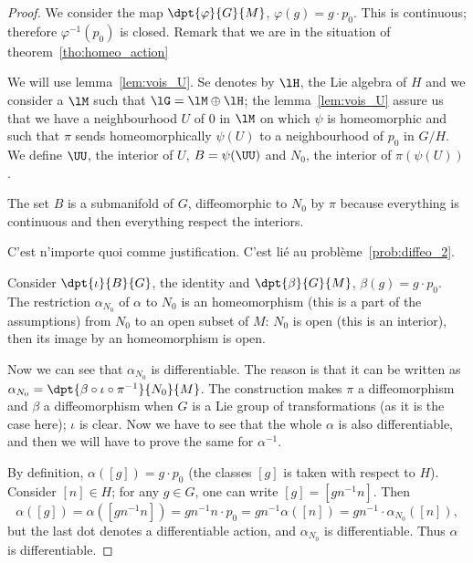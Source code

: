 \begin{proof}
	We consider the map $\dpt{\varphi}{G}{M}$, $\varphi(g)=g\cdot p_0$. This is continuous; therefore $\varphi^{-1}(p_0)$ is closed. Remark that we are in the situation of theorem~\ref{tho:homeo_action}

	We will use lemma~\ref{lem:vois_U}. Se denotes by $\lH$, the Lie algebra of $H$ and we consider a $\lM$ such that $\lG=\lM\oplus\lH$; the lemma~\ref{lem:vois_U} assure us that we have a neighbourhood $U$ of $0$ in $\lM$ on which $\psi$ is homeomorphic and such that $\pi$ sends homeomorphically $\psi(U)$ to a neighbourhood of $p_0$ in $G/H$. We define $\UU$, the interior of $U$, $B=\psi(\UU)$ and $N_0$, the interior of $\pi(\psi(U))$.

	The set $B$ is a submanifold of $G$, diffeomorphic to $N_0$ by $\pi$ because everything is continuous and then everything respect the interiors.

	\begin{probleme}
		C'est n'importe quoi comme justification. C'est lié au problème~\ref{prob:diffeo_2}.
		\label{prob:diffeo_1}
	\end{probleme}

	Consider $\dpt{\iota}{B}{G}$, the identity and $\dpt{\beta}{G}{M}$, $\beta(g)=g\cdot p_0$. The restriction $\alpha_{N_0}$ of $\alpha$ to $N_0$ is an homeomorphism (this is a part of the assumptions) from $N_0$ to an open subset of $M$: $N_0$ is open (this is an interior), then its image by an homeomorphism is open.

	Now we can see that $\alpha_{N_0}$ is differentiable. The reason is that it can be written as $\alpha_{N_0}=\dpt{\beta\circ\iota\circ\pi^{-1}}{N_0}{M}$. The construction makes $\pi$ a diffeomorphism and $\beta$ a diffeomorphism when $G$ is a Lie group of transformations (as it is the case here); $\iota$ is clear. Now we have to see that the whole $\alpha$ is also differentiable, and then we will have to prove the same for $\alpha^{-1}$.

	By definition, $\alpha([g])=g\cdot p_0$ (the classes $[g]$ is taken with respect to $H$). Consider $[n]\in H$; for any $g\in G$, one can write $[g]=[gn^{-1} n]$. Then
	\begin{equation}
		\alpha([g])=\alpha([gn^{-1} n])
		=gn^{-1} n\cdot p_0
		=gn^{-1}\alpha([n])
		=gn^{-1}\cdot\alpha_{N_0}([n]),
	\end{equation}
	but the last dot denotes a differentiable action, and $\alpha_{N_0}$ is differentiable. Thus $\alpha$ is differentiable.


\end{proof}
